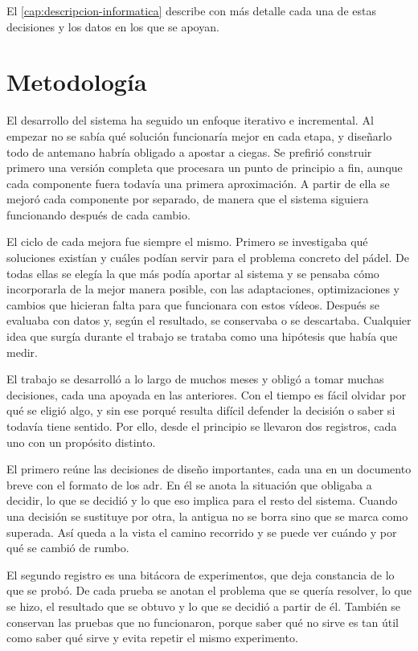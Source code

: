 El \cref{cap:descripcion-informatica} describe con más detalle cada una de estas decisiones y los datos en los que se apoyan.

\section{Metodología}
\label{sec:metodologia}

El desarrollo del sistema ha seguido un enfoque iterativo e incremental.
Al empezar no se sabía qué solución funcionaría mejor en cada etapa, y diseñarlo todo de antemano habría obligado a apostar a ciegas.
Se prefirió construir primero una versión completa que procesara un punto de principio a fin, aunque cada componente fuera todavía una primera aproximación.
A partir de ella se mejoró cada componente por separado, de manera que el sistema siguiera funcionando después de cada cambio.

El ciclo de cada mejora fue siempre el mismo.
Primero se investigaba qué soluciones existían y cuáles podían servir para el problema concreto del pádel.
De todas ellas se elegía la que más podía aportar al sistema y se pensaba cómo incorporarla de la mejor manera posible, con las adaptaciones, optimizaciones y cambios que hicieran falta para que funcionara con estos vídeos.
Después se evaluaba con datos y, según el resultado, se conservaba o se descartaba.
Cualquier idea que surgía durante el trabajo se trataba como una hipótesis que había que medir.

El trabajo se desarrolló a lo largo de muchos meses y obligó a tomar muchas decisiones, cada una apoyada en las anteriores.
Con el tiempo es fácil olvidar por qué se eligió algo, y sin ese porqué resulta difícil defender la decisión o saber si todavía tiene sentido.
Por ello, desde el principio se llevaron dos registros, cada uno con un propósito distinto.

El primero reúne las decisiones de diseño importantes, cada una en un documento breve con el formato de los \ac{adr}.
En él se anota la situación que obligaba a decidir, lo que se decidió y lo que eso implica para el resto del sistema.
Cuando una decisión se sustituye por otra, la antigua no se borra sino que se marca como superada.
Así queda a la vista el camino recorrido y se puede ver cuándo y por qué se cambió de rumbo.

El segundo registro es una bitácora de experimentos, que deja constancia de lo que se probó.
De cada prueba se anotan el problema que se quería resolver, lo que se hizo, el resultado que se obtuvo y lo que se decidió a partir de él.
También se conservan las pruebas que no funcionaron, porque saber qué no sirve es tan útil como saber qué sirve y evita repetir el mismo experimento.

